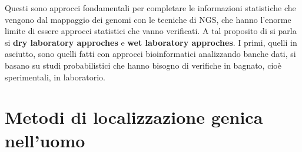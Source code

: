 \documentclass[11pt]{book}
\begin{document}
Questi sono approcci fondamentali per completare le informazioni statistiche che vengono dal mappaggio dei genomi con le tecniche di NGS, che hanno l’enorme limite di essere approcci statistici che vanno verificati. A tal proposito di si parla si \textbf{dry laboratory approches} e \textbf{wet laboratory approches}. I primi, quelli in asciutto, sono quelli fatti con approcci bioinformatici analizzando banche dati, si basano su studi probabilistici che hanno bisogno di verifiche in bagnato, cioè sperimentali, in laboratorio.



\section{Metodi di localizzazione genica nell'uomo}
\end{document}
